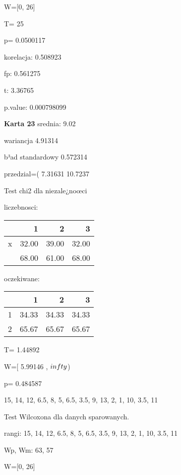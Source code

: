 \documentclass[a4paper,12pt]{article}
\begin{document}
\begin{multicols}{3}
  W=[0, 26]  
  
  T=  25 
  
  p= 0.0500117 \vspace{1cm} 

  korelacja: 0.508923
     
     fp: 0.561275
     
     t: 3.36765
     
     p.value: 0.000798099 \vspace{1cm} 

  \textbf{Karta  23 } 
 srednia: 9.02 
     
     wariancja 4.91314  
     
     b³ad standardowy 0.572314 
     
     przedzial=( 7.31631 10.7237 \vspace{1cm} 

  Test chi2 dla niezale¿noœci 
   
   liczebnosci: %
\begin{tabular}{rrrr}
  \hline
 & 1 & 2 & 3 \\
  \hline
x & 32.00 & 39.00 & 32.00 \\
   & 68.00 & 61.00 & 68.00 \\
   \hline
\end{tabular}
 
   
   oczekiwane: %
\begin{tabular}{rrrr}
  \hline
 & 1 & 2 & 3 \\
  \hline
1 & 34.33 & 34.33 & 34.33 \\
  2 & 65.67 & 65.67 & 65.67 \\
   \hline
\end{tabular}
 
   
   T= 1.44892 
   
   W=[ 5.99146 , $\\infty$) 
   
   p= 0.484587 \vspace{1cm} 

  15, 14, 12, 6.5, 8, 5, 6.5, 3.5, 9, 13, 2, 1, 10, 3.5, 11 

  Test Wilcoxona dla danych sparowanych. 
  
  rangi: 15, 14, 12, 6.5, 8, 5, 6.5, 3.5, 9, 13, 2, 1, 10, 3.5, 11 
  
  Wp, Wm:  63,  57 
  
  W=[0, 26]  
  

\end{multicols}
\end{document}

